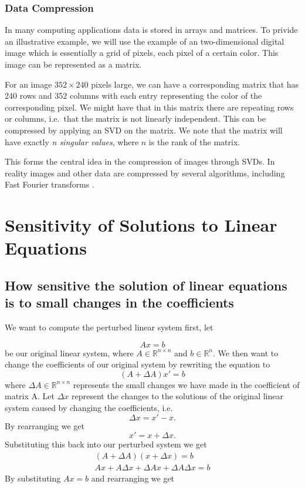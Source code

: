 \documentclass[12pt,reqno,twoside,titlepage]{article}
\theoremstyle{definition}
\begin{document}
\subsubsection{Data Compression}
\label{sec:3:ic}

In many computing applications data is stored in arrays and matrices.
To privide an illustrative example, we will use the example of an two-dimensional digital image which is essentially a grid of pixels, each pixel of a certain color.
This image can be represented as a matrix.

For an image $352 \times 240$ pixels large, we can have a corresponding matrix that has 240 rows and 352 columns with each entry representing the color of the corresponding pixel.
We might have that in this matrix there are repeating rows or columns, i.e.\ that the matrix is not linearly independent.
This can be compressed by applying an SVD on the matrix. We note that the matrix will have exactly \emph{n singular values}, where $n$ is the rank of the matrix.

This forms the central idea in the compression of images through SVDs. In reality images and other data are compressed by several algorithms, including Fast Fourier transforms \cite{strang09}.


\section{Sensitivity of Solutions to Linear Equations}
\label{sec:ssl}
\subsection{How sensitive the solution of linear equations is to small changes in the coefficients }
We want to compute the perturbed linear system first, let

$$Ax=b$$
be our original linear system, where $A\in\mathbb{R}^{n\times n}$ and $b\in\mathbb{R}^n$.
\newline
We then want to change the coefficients of our original system by rewriting the equation to
$$(A+\Delta A)x'=b$$
where $\Delta A\in \mathbb{R}^{n\times n}$ represents the small changes we have made in the coefficient of matrix A.
\newline
Let $\Delta x$ represent the changes to the solutions of the original linear system caused by changing the coefficients, i.e. 
$$\Delta x=x'-x.$$
\newline 
By rearranging we get
$$x'=x+\Delta x.$$
Substituting this back into our perturbed system we get
\begin{align*}
(A+\Delta A)(x+\Delta x)= b\\
Ax+A\Delta x+\Delta A x+\Delta A\Delta x=b
\end{align*}
By substituting $Ax=b$ and rearranging  we get
\end{document}
